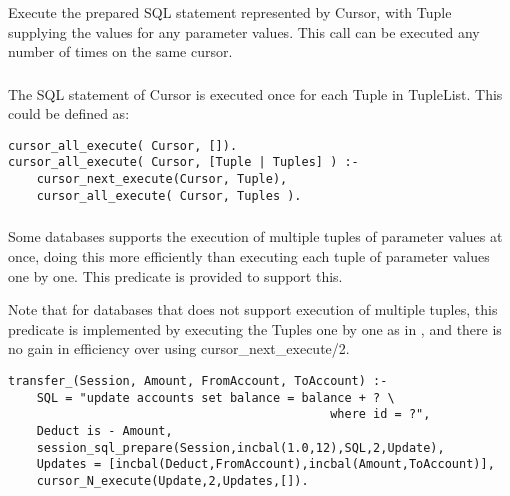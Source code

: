 \subsubsection{}
\label{cursor-next-execute/2}

Execute the prepared SQL statement represented by Cursor, with Tuple
supplying the values for any parameter values.
This call can be executed any number of times on the same cursor.

\subsubsection
{}
\label{cursor-all-execute/2}

The SQL statement of Cursor is executed once for each Tuple in 
TupleList. This could be defined as:
\begin{verbatim}
cursor_all_execute( Cursor, []).
cursor_all_execute( Cursor, [Tuple | Tuples] ) :-
    cursor_next_execute(Cursor, Tuple),
    cursor_all_execute( Cursor, Tuples ).
\end{verbatim}

\subsubsection
{}
\label{cursor-N-execute/4}

Some databases supports the execution of multiple tuples of parameter values at
once, doing this more efficiently than executing each tuple of parameter
values one by one. This predicate is provided to support this. 

Note that for databases that does not support execution of multiple tuples, this
predicate is implemented by executing the Tuples one by one as in 
,
and there is no gain in efficiency over using cursor_next_execute/2.

\begin{verbatim}
transfer_(Session, Amount, FromAccount, ToAccount) :-
    SQL = "update accounts set balance = balance + ? \
                                             where id = ?",
    Deduct is - Amount,
    session_sql_prepare(Session,incbal(1.0,12),SQL,2,Update),
    Updates = [incbal(Deduct,FromAccount),incbal(Amount,ToAccount)],
    cursor_N_execute(Update,2,Updates,[]).
\end{verbatim}


